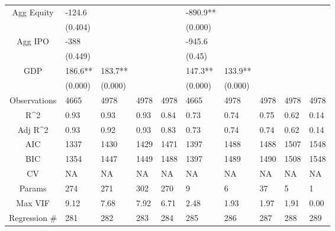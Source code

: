 \documentclass{article}
\begin{document}
\begin{table}[H]
\begin{tabular}{|clllllllll|}
  Agg Equity & -124.6 &  &  &  & -890.9** &  &  &  &  \\ 
   & (0.404) &  &  &  & (0.000) &  &  &  &  \\ 
  Agg IPO & -388 &  &  &  & -945.6 &  &  &  &  \\ 
   & (0.449) &  &  &  & (0.45) &  &  &  &  \\ 
  GDP & 186.6** & 183.7** &  &  & 147.3** & 133.9** &  &  &  \\ 
   & (0.000) & (0.000) &  &  & (0.000) & (0.000) &  &  &  \\ 
  \hline 
 Observations & 4665 & 4978 & 4978 & 4978 & 4665 & 4978 & 4978 & 4978 & 4978 \\ 
  R^2 & 0.93 & 0.93 & 0.93 & 0.84 & 0.73 & 0.74 & 0.75 & 0.62 & 0.14 \\ 
  Adj R^2 & 0.93 & 0.92 & 0.93 & 0.83 & 0.73 & 0.74 & 0.74 & 0.62 & 0.14 \\ 
  AIC & 1337 & 1430 & 1429 & 1471 & 1397 & 1488 & 1488 & 1507 & 1548 \\ 
  BIC & 1354 & 1447 & 1449 & 1488 & 1397 & 1489 & 1490 & 1508 & 1548 \\ 
  CV & NA & NA & NA & NA & NA & NA & NA & NA & NA \\ 
  Params & 274 & 271 & 302 & 270 & 9 & 6 & 37 & 5 & 1 \\ 
  Max VIF & 9.12 & 7.68 & 7.92 & 6.71 & 2.48 & 1.93 & 1.97 & 1.91 & 0.00 \\ 
  Regression \# & 281 & 282 & 283 & 284 & 285 & 286 & 287 & 288 & 289 \\ 
   \hline
\end{tabular}
 
\end{table}
\end{document}
